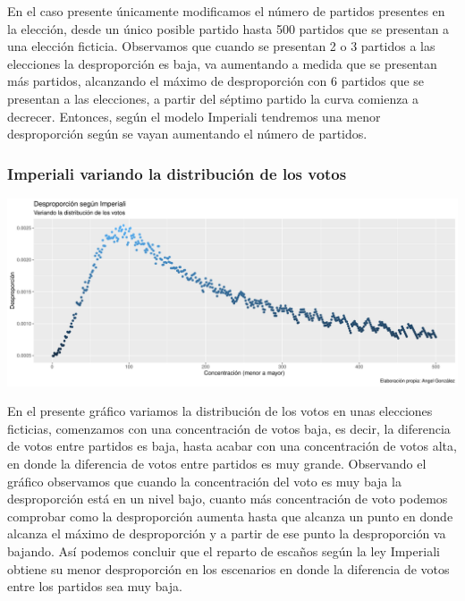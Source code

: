 \documentclass[12pt,a4paper,]{book}
\numberwithin{dummy}{section}
\theoremstyle{ocrenumbox}
\theoremstyle{blacknumex}
\theoremstyle{blacknumbox}
\theoremstyle{ocrenum}
\theoremstyle{ocrenum}
\begin{document}
En el caso presente únicamente modificamos el número de partidos
presentes en la elección, desde un único posible partido hasta 500
partidos que se presentan a una elección ficticia. Observamos que cuando
se presentan 2 o 3 partidos a las elecciones la desproporción es baja,
va aumentando a medida que se presentan más partidos, alcanzando el
máximo de desproporción con 6 partidos que se presentan a las
elecciones, a partir del séptimo partido la curva comienza a decrecer.
Entonces, según el modelo Imperiali tendremos una menor desproporción
según se vayan aumentando el número de partidos.

\hypertarget{imperiali-variando-la-distribuciuxf3n-de-los-votos}{%
\subsubsection{Imperiali variando la distribución de los
votos}\label{imperiali-variando-la-distribuciuxf3n-de-los-votos}}

\begin{center}\includegraphics[width=0.95\linewidth]{figurasR/unnamed-chunk-26-1} \end{center}

En el presente gráfico variamos la distribución de los votos en unas
elecciones ficticias, comenzamos con una concentración de votos baja, es
decir, la diferencia de votos entre partidos es baja, hasta acabar con
una concentración de votos alta, en donde la diferencia de votos entre
partidos es muy grande. Observando el gráfico observamos que cuando la
concentración del voto es muy baja la desproporción está en un nivel
bajo, cuanto más concentración de voto podemos comprobar como la
desproporción aumenta hasta que alcanza un punto en donde alcanza el
máximo de desproporción y a partir de ese punto la desproporción va
bajando. Así podemos concluir que el reparto de escaños según la ley
Imperiali obtiene su menor desproporción en los escenarios en donde la
diferencia de votos entre los partidos sea muy baja.
\end{document}
